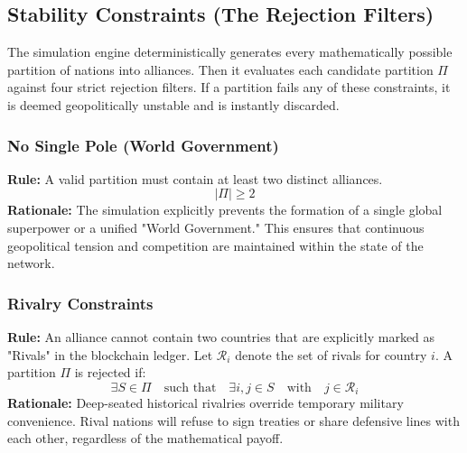 \subsection{Stability Constraints (The Rejection Filters)}
The simulation engine deterministically generates every mathematically possible partition of nations into alliances. Then it evaluates each candidate partition $\Pi$ against four strict rejection filters. If a partition fails any of these constraints, it is deemed geopolitically unstable and is instantly discarded.

\subsubsection{No Single Pole (World Government)}
\textbf{Rule:} A valid partition must contain at least two distinct alliances.
\begin{equation}
|\Pi| \ge 2
\end{equation}
\textbf{Rationale:} The simulation explicitly prevents the formation of a single global superpower or a unified "World Government." This ensures that continuous geopolitical tension and competition are maintained within the state of the network.

\subsubsection{Rivalry Constraints}
\textbf{Rule:} An alliance cannot contain two countries that are explicitly marked as "Rivals" in the blockchain ledger. Let $\mathcal{R}_i$ denote the set of rivals for country $i$. A partition $\Pi$ is rejected if:
\begin{equation}
\exists S \in \Pi \quad \text{such that} \quad \exists i, j \in S \quad \text{with} \quad j \in \mathcal{R}_i
\end{equation}
\textbf{Rationale:} Deep-seated historical rivalries override temporary military convenience. Rival nations will refuse to sign treaties or share defensive lines with each other, regardless of the mathematical payoff.


